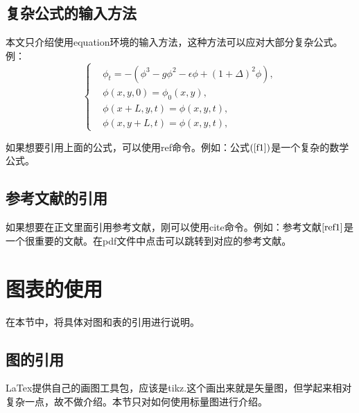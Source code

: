 \documentclass[10pt,a4paper]{article}
\begin{document}
    \subsection{复杂公式的输入方法}
    本文只介绍使用equation环境的输入方法，这种方法可以应对大部分复杂公式。例：
    \begin{equation}
    \label{f1}%
        \left\{ %
        \begin{aligned}
            &\phi _t =-(\phi^3 -g\phi ^2-\epsilon \phi +(1+\Delta  )^2 \phi),\\
            &\phi(x,y,0)=\phi_0(x,y),\\
            &\phi (x+L,y,t)=\phi(x,y,t),\\
            &\phi (x,y+L,t)=\phi (x,y,t),
        \end{aligned}
		\right.\tag{2.2}
    \end{equation}

    如果想要引用上面的公式，可以使用ref命令。例如：公式$(\ref{f1})$是一个复杂的数学公式。

    \subsection{参考文献的引用}
    如果想要在正文里面引用参考文献，刚可以使用cite命令。例如：参考文献$\cite{ref1}$是一个很重要的文献。在pdf文件中点击可以跳转到对应的参考文献。









    \newpage
    \section{图表的使用}
    在本节中，将具体对图和表的引用进行说明。



    \subsection{图的引用}
    LaTex提供自己的画图工具包，应该是tikz.这个画出来就是矢量图，但学起来相对复杂一点，故不做介绍。本节只对如何使用标量图进行介绍。
\end{document}

